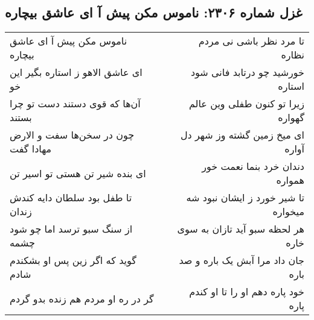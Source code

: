 \begin{center}
\section*{غزل شماره ۲۳۰۶: ناموس مکن پیش آ ای عاشق بیچاره}
\label{sec:2306}
\begin{longtable}{l p{0.5cm} r}
ناموس مکن پیش آ ای عاشق بیچاره
&&
تا مرد نظر باشی نی مردم نظاره
\\
ای عاشق الاهو ز استاره بگیر این خو
&&
خورشید چو درتابد فانی شود استاره
\\
آن‌ها که قوی دستند دست تو چرا بستند
&&
زیرا تو کنون طفلی وین عالم گهواره
\\
چون در سخن‌ها سفت و الارض مهادا گفت
&&
ای میخ زمین گشته وز شهر دل آواره
\\
ای بنده شیر تن هستی تو اسیر تن
&&
دندان خرد بنما نعمت خور همواره
\\
تا طفل بود سلطان دایه کندش زندان
&&
تا شیر خورد ز ایشان نبود شه میخواره
\\
از سنگ سبو ترسد اما چو شود چشمه
&&
هر لحظه سبو آید تازان به سوی خاره
\\
گوید که اگر زین پس او بشکندم شادم
&&
جان داد مرا آبش یک باره و صد باره
\\
گر در ره او مردم هم زنده بدو گردم
&&
خود پاره دهم او را تا او کندم پاره
\\
\end{longtable}
\end{center}
